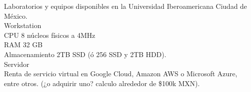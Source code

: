 Laboratorios y equipos disponibles en la Universidad Iberoamericana Ciudad de México.\\
Workstation\\
CPU 8 núcleos físicos a 4MHz\\
RAM 32 GB\\
Almacenamiento 2TB SSD (ó 256 SSD y 2TB HDD).\\

Servidor\\
Renta de servicio virtual en Google Cloud, Amazon AWS o Microsoft Azure, entre otros. (¿o adquirir uno? calculo alrededor de \$100k MXN).